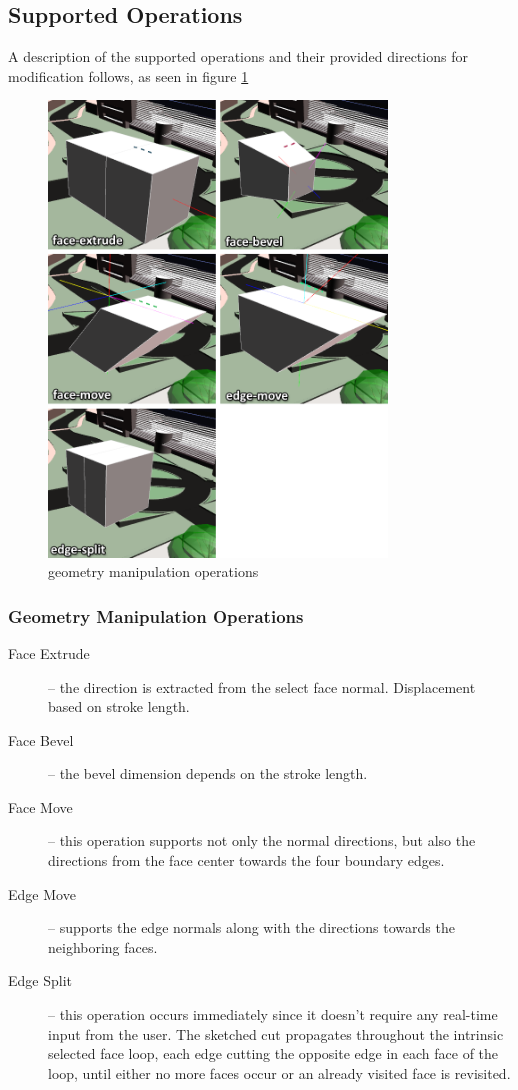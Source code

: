 \subsection{Supported Operations}

A description of the supported operations and their provided directions for modification follows,
as seen in figure \ref{fig:shots}

\begin{figure}[!ht]
	\centering
	\includegraphics[width=9cm]{gfx/shots2.png}
	\caption{geometry manipulation operations}
	\label{fig:shots}
\end{figure}

\subsubsection{Geometry Manipulation Operations}

\begin{description}
	\item[Face Extrude] --
		the direction is extracted from the select face normal. Displacement based on stroke length.
		
	\item[Face Bevel] --
		the bevel dimension depends on the stroke length.
		
	\item[Face Move] --
		this operation supports not only the normal directions,
		but also the directions from the face center towards the four boundary edges.
		
	\item[Edge Move] --
		supports the edge normals along with the directions towards the neighboring faces.
		
	\item[Edge Split] --
		this operation occurs immediately since it doesn't require any real-time input from the user.
		The sketched cut propagates throughout the intrinsic selected face loop, each edge cutting
		the opposite edge in each face of the loop, until either no more faces occur or an already
		visited face is revisited.
\end{description}


